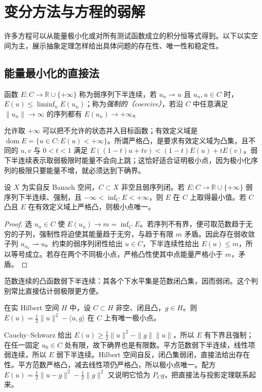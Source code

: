 \setcounter{chapter}{12} %
\chapter{变分方法与方程的弱解}
\label{chap:fa-variational}

许多方程可以从能量极小化或对所有测试函数成立的积分恒等式得到。以下以实空间为主，展示抽象定理怎样给出具体问题的存在性、唯一性和稳定性。

\section{能量最小化的直接法}
函数 $E:C\to\mathbb R\cup\{+\infty\}$ 称为弱序列下半连续，若 $u_n\rightharpoonup u$ 且 $u_n,u\in C$ 时，$E(u)\leq\liminf_nE(u_n)$；称为\emph{强制的（coercive）}，若沿 $C$ 中任意满足 $\|u_n\|\to\infty$ 的序列都有 $E(u_n)\to+\infty$。

允许取 $+\infty$ 可以把不允许的状态并入目标函数；有效定义域是 $\operatorname{dom}E=\{u\in C:E(u)<+\infty\}$。所谓严格凸，是要求有效定义域为凸集，且不同的 $u,v$ 与 $0<t<1$ 满足 $E((1-t)u+tv)<(1-t)E(u)+tE(v)$。弱下半连续表示取弱极限时能量不会向上跳；这恰好适合证明极小点，因为极小化序列的极限只要能量不增，就必须达到下确界。

\begin{theorem}[直接法]\label{thm:fa-direct-method}
设 $X$ 为实自反 Banach 空间，$C\subset X$ 非空且弱序列闭。若 $E:C\to\mathbb R\cup\{+\infty\}$ 弱序列下半连续、强制，且 $-\infty<\inf_CE<+\infty$，则 $E$ 在 $C$ 上取得最小值。若 $C$ 凸且 $E$ 在有效定义域上严格凸，则极小点唯一。
\end{theorem}
\begin{proof}
选 $u_n\in C$ 使 $E(u_n)\to m=\inf_CE$。若序列不有界，便可取范数趋于无穷的子列，强制性将迫使其能量趋于无穷，与趋于有限 $m$ 矛盾。因此存在弱收敛子列 $u_{n_k}\rightharpoonup u$。约束的弱序列闭性给出 $u\in C$，下半连续性给出 $E(u)\leq m$，所以等号成立。若存在两个不同极小点，严格凸性使其中点能量严格小于 $m$，矛盾。
\end{proof}
范数连续的凸函数弱下半连续：其各个下水平集是范数闭凸集，因而弱闭。这个判别常比直接估计弱极限更方便。

\begin{example}[直接法的完整使用]
在实 Hilbert 空间 $H$ 中，设 $C\subset H$ 非空、闭且凸，$g\in H$。则 $E(u)=\frac12\|u\|^2-\langle u,g\rangle$ 在 $C$ 上有唯一极小点。
\end{example}
\begin{solve}
Cauchy--Schwarz 给出 $E(u)\geq\frac12\|u\|^2-\|g\|\|u\|$，所以 $E$ 有下界且强制；在任一固定 $u_0\in C$ 处有限，故下确界也是有限数。平方范数弱下半连续，线性项弱连续，所以 $E$ 弱下半连续。Hilbert 空间自反，闭凸集弱闭，直接法给出存在性。平方范数严格凸，减去线性项仍严格凸，所以极小点唯一。配方 $E(u)=\frac12\|u-g\|^2-\frac12\|g\|^2$ 又说明它恰为 $P_Cg$，把直接法与投影定理联系起来。
\end{solve}

